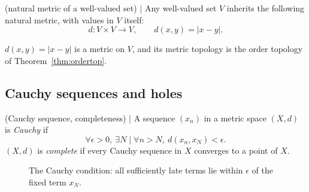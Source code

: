\begin{definition} (natural metric of a well-valued set) $\mid$ \label{def:natmetric}
Any well-valued set $V$ inherits the following natural metric, with values in
$V$ itself:
\[
d:V\times V\to V,\qquad d(x,y)=|x-y| .
\]
\end{definition}

\begin{lemma} \label{lem:natmetric}
$d(x,y)=|x-y|$ is a metric on $V$, and its metric topology is the order
topology of Theorem~\ref{thm:ordertop}.
\end{lemma}


\subsection{Cauchy sequences and holes}

\begin{definition} (Cauchy sequence, completeness) $\mid$
A sequence $(x_n)$ in a metric space $(X,d)$ is \emph{Cauchy} if
\[
\forall \epsilon>0,\ \exists N \mid \forall n>N,\ d(x_n,x_N)<\epsilon.
\]
$(X,d)$ is \emph{complete} if every Cauchy sequence in $X$ converges to a
point of $X$.
\end{definition}


\begin{figure}[H]
\centering
{}
\caption{The Cauchy condition: all sufficiently late terms lie within
$\epsilon$ of the fixed term $x_N$.}
\label{fig:cauchy}
\end{figure}

